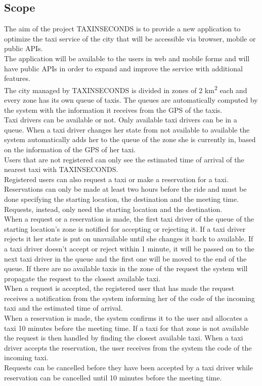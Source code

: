 \documentclass{article}
\begin{document}
\subsection{Scope}
The aim of the project TAXINSECONDS is to provide a new application to optimize the taxi service of the city that will be accessible via browser, mobile or public APIs.
\\The application will be available to the users in web and mobile forms and will have public APIs in order to expand and improve the service with additional features.
\\The city managed by TAXINSECONDS is divided in zones of 2 km\textsuperscript{2} each and every zone has its own queue of taxis. The queues are automatically computed by the system with the information it receives from the GPS of the taxis. 
\\Taxi drivers can be available or not. Only available taxi drivers can be in a queue. When a taxi driver changes her state from not available to available the system automatically adds her to the queue of the zone she is currently in, based on the information of the GPS of her taxi. 
\\Users that are not registered can only see the estimated time of arrival of the nearest taxi with TAXINSECONDS.\@
\\Registered users can also request a taxi or make a reservation for a taxi. Reservations can only be made at least two hours before the ride and must be done specifying the starting location, the destination and the meeting time. Requests, instead, only need the starting location and the destination.
\\When a request or a reservation is made, the first taxi driver of the queue of the starting location's zone is notified for accepting or rejecting it. If a taxi driver rejects it her state is put on unavailable until she changes it back to available. If a taxi driver doesn't accept or reject within 1 minute, it will be passed on to the next taxi driver in the queue and the first one will be moved to the end of the queue. If there are no available taxis in the zone of the request the system will propagate the request to the closest available taxi.
\\When a request is accepted, the registered user that has made the request receives a notification from the system informing her of the code of the incoming taxi and the estimated time of arrival.
\\When a reservation is made, the system confirms it to the user and allocates a taxi 10 minutes before the meeting time. If a taxi for that zone is not available the request is then handled by finding the closest available taxi. When a taxi driver accepts the reservation, the user receives from the system the code of the incoming taxi. %
\\Requests can be cancelled before they have been accepted by a taxi driver while reservation can be cancelled until 10 minutes before the meeting time.
\\%
\end{document}
